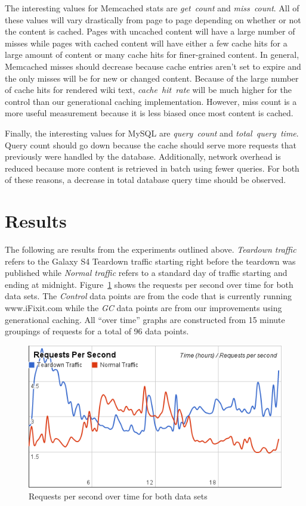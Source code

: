 \documentclass[12pt]{ucthesis}
\begin{document}
The interesting values for \textsf{Memcached} stats are \textit{get~count} and \textit{miss~count}.
All of these values will vary drastically from page to page depending on whether or not the content is cached.
Pages with uncached content will have a large number of misses while pages with cached content will have either a few cache hits for a large amount of content or many cache hits for finer-grained content.
In general, \textsf{Memcached} misses should decrease because cache entries aren't set to expire and the only misses will be for new or changed content.
Because of the large number of cache hits for rendered wiki text, \textit{cache~hit~rate} will be much higher for the control than our generational caching implementation.
However, miss count is a more useful measurement because it is less biased once most content is cached.

Finally, the interesting values for \textsf{MySQL} are \textit{query~count} and \textit{total~query~time}.
Query count should go down because the cache should serve more requests that previously were handled by the database.
Additionally, network overhead is reduced because more content is retrieved in batch using fewer queries.
For both of these reasons, a decrease in total database query time should be observed.

\section{Results} \label{results}
The following are results from the experiments outlined above.
\textit{Teardown traffic} refers to the Galaxy S4 Teardown traffic starting right before the teardown was published while \textit{Normal traffic} refers to a standard day of traffic starting and ending at midnight.
Figure~\ref{fig:requestsPerSecXTime} shows the requests per second over time for both data sets.
The \textit{Control} data points are from the code that is currently running \textsf{www.iFixit.com} while the \textit{GC} data points are from our improvements using generational caching.
All ``over time'' graphs are constructed from 15 minute groupings of requests for a total of 96 data points.

\begin{figure}[h]
\centering
\includegraphics[width=\textwidth]{assets/requestsPerSecXTime.png}
\caption{Requests per second over time for both data sets}
\label{fig:requestsPerSecXTime}
\end{figure}
\end{document}
